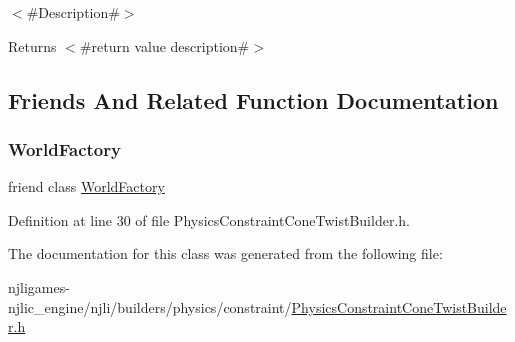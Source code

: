 $<$\#\+Description\#$>$

\begin{DoxyReturn}{Returns}
$<$\#return value description\#$>$ 
\end{DoxyReturn}


\subsection{Friends And Related Function Documentation}
\mbox{\label{classnjli_1_1_physics_constraint_cone_twist_builder_acb96ebb09abe8f2a37a915a842babfac}} 
\subsubsection{\texorpdfstring{World\+Factory}{WorldFactory}}
{\footnotesize\ttfamily friend class \mbox{\hyperlink{classnjli_1_1_world_factory}{World\+Factory}}\hspace{0.3cm}{\ttfamily [friend]}}



Definition at line 30 of file Physics\+Constraint\+Cone\+Twist\+Builder.\+h.



The documentation for this class was generated from the following file\+:\begin{DoxyCompactItemize}
\item 
njligames-\/njlic\+\_\+engine/njli/builders/physics/constraint/\mbox{\hyperlink{_physics_constraint_cone_twist_builder_8h}{Physics\+Constraint\+Cone\+Twist\+Builder.\+h}}\end{DoxyCompactItemize}
